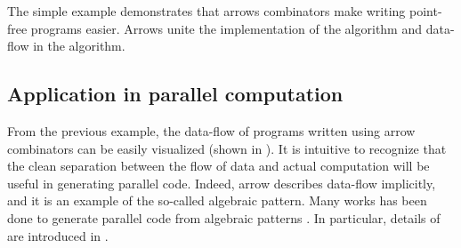 The simple example demonstrates that arrows combinators make writing point-free programs easier. Arrows unite the implementation of the algorithm and data-flow in the algorithm. 

\subsection{Application in parallel computation}
From the previous example, the data-flow of programs written using arrow combinators can be easily visualized (shown in ). It is intuitive to recognize that the clean separation between the flow of data and actual computation will be useful in generating parallel code. Indeed, arrow describes data-flow implicitly, and it is an example of the so-called algebraic pattern. Many works has been done to generate parallel code from algebraic patterns \cite{braunArrowsParallelComputation2018, elliottGenericFunctionalParallel2017b, castroAlgebraicMultipartyProtocol}. In particular, details of \cite{castroAlgebraicMultipartyProtocol} are introduced in .


